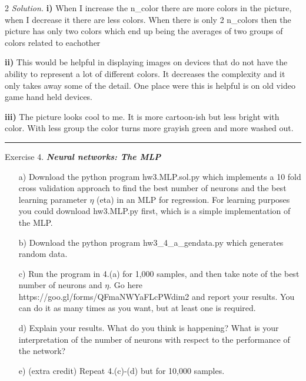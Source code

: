 \documentclass[12pt]{article}
\newcommand{\spacingfactor}{2}
\newcommand\myqed{}                 %
\newcommand{\printmyqed}[1][]       %
  {%
  \ifthenelse{\equal{#1}{Proof}}
  {\renewcommand{\myqed}{\qed}}
  {\renewcommand{\myqed}{}}
  }
\newenvironment{exercise}[1][]{%
  \bigskip                          %
  \noindent \textsf{Exercise #1.}\slshape }{}
\newenvironment{response}[1][\textit{Solution}]{%
  \printmyqed[#1]
  \begin{spacing}{\spacingfactor}
  \medskip                          %
  \noindent \textit{#1.}}{\myqed\end{spacing}\medskip\hrule}
\begin{document}
\begin{response}[Solution]
  \textbf{i)} When I increase the n\_color there are more 
  colors in the picture, when I decrease it there are less 
  colors. When there is only 2 n\_colors then the picture 
  has only two colors which end up being the averages of 
  two groups of colors related to eachother 

  \textbf{ii)} This would be helpful in displaying images 
  on devices that do not have the ability to represent a lot 
  of different colors. It decreases the complexity and it only 
  takes away some of the detail. One place were this is helpful 
  is on old video game hand held devices. 

  \textbf{iii)} The picture looks cool to me. It is more cartoon-ish 
  but less bright with color. With less group the color turns 
  more grayish green and more washed out. 
  
  
\end{response}



\begin{exercise}[4] %
  \textbf{Neural networks: The MLP}
  \begin{enumerate}
    \item[a)] Download the python program hw3.MLP.sol.py which implements a 
    10 fold cross validation approach to find the best number of 
    neurons and the best learning parameter $\eta$ (eta) in an MLP
    for regression. For learning purposes you could download hw3.MLP.py first, which is a simple
    implementation of the MLP.
    \item[b)] Download the python program hw3\_4\_a\_gendata.py which generates random data.
    \item[c)] Run the program in 4.(a) for 1,000 samples, and then take note of the best number of neurons
    and $\eta$. Go here https://goo.gl/forms/QFmaNWYaFLcPWdim2 and report your results. You can
    do it as many times as you want, but at least one is required. 
    \item[d)] Explain your results. What do you think is happening? What is your interpretation of the
    number of neurons with respect to the performance of the network?
    \item[e)]  (extra credit) Repeat 4.(c)-(d) but for 10,000 samples.
  \end{enumerate}
\end{exercise}
   
\end{document}
